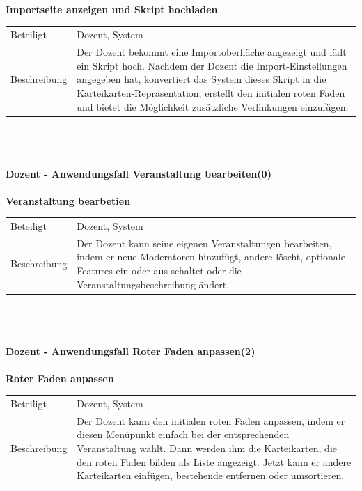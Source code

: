 \documentclass[12pt,a4paper]{article}
\begin{document}
{	\textbf{Importseite anzeigen und Skript hochladen}\\
	\begin{tabular}{l|p{12cm}}
		\hline 
		Beteiligt & Dozent, System \\ 
		Beschreibung & Der Dozent bekommt eine Importoberfläche angezeigt und lädt ein Skript hoch. Nachdem der Dozent die Import-Einstellungen angegeben hat, konvertiert das System dieses Skript in die Karteikarten-Repräsentation, erstellt den initialen roten Faden und bietet die Möglichkeit zusätzliche Verlinkungen einzufügen. \\ 
	\end{tabular}\\\\
	
	\newpage
	
	\paragraph{Dozent - Anwendungsfall \glqq Veranstaltung bearbeiten\grqq (0)}\mbox{}
	
	\textbf{Veranstaltung bearbetien}\\
	\begin{tabular}{l|p{12cm}}
		\hline 
		Beteiligt & Dozent, System \\ 
		Beschreibung & Der Dozent kann seine eigenen Veranstaltungen bearbeiten, indem er neue Moderatoren hinzufügt, andere löscht, optionale Features ein oder aus schaltet oder die Veranstaltungsbeschreibung ändert. \\ 
	\end{tabular}\\\\
	
	
	\paragraph{Dozent - Anwendungsfall \glqq Roter Faden anpassen\grqq (2)}\mbox{}
	
	\textbf{Roter Faden anpassen}\\
	\begin{tabular}{l|p{12cm}}
		\hline 
		Beteiligt & Dozent, System \\ 
		Beschreibung & Der Dozent kann den initialen roten Faden anpassen, indem er diesen Menüpunkt einfach bei der entsprechenden Veranstaltung wählt. Dann werden ihm die Karteikarten, die den roten Faden bilden als Liste angezeigt. Jetzt kann er andere Karteikarten einfügen, bestehende entfernen oder umsortieren. \\ 
	\end{tabular}\\\\
	
}
\end{document}
